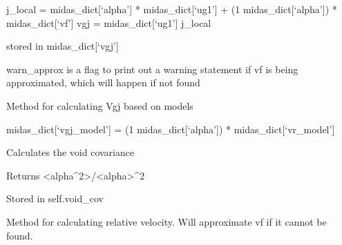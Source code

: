 \documentclass[letterpaper,10pt,english]{sphinxmanual}
\begin{document}
\begin{fulllineitems}
\begin{fulllineitems}
\sphinxAtStartPar
j\_local = midas\_dict{[}‘alpha’{]} * midas\_dict{[}‘ug1’{]} + (1 \sphinxhyphen{} midas\_dict{[}‘alpha’{]}) * midas\_dict{[}‘vf’{]}
vgj = midas\_dict{[}‘ug1’{]} \sphinxhyphen{} j\_local

\sphinxAtStartPar
stored in midas\_dict{[}‘vgj’{]}

\sphinxAtStartPar
warn\_approx is a flag to print out a warning statement if vf is being approximated, which will
happen if not found

\end{fulllineitems}


\begin{fulllineitems}
\label{\detokenize{api/MARIGOLD.Condition:MARIGOLD.Condition.calc_vgj_model}}
\pysigstartsignatures
{}
\pysigstopsignatures
\sphinxAtStartPar
Method for calculating Vgj based on models

\sphinxAtStartPar
midas\_dict{[}‘vgj\_model’{]} = (1 \sphinxhyphen{} midas\_dict{[}‘alpha’{]}) * midas\_dict{[}‘vr\_model’{]}

\end{fulllineitems}


\begin{fulllineitems}
\label{\detokenize{api/MARIGOLD.Condition:MARIGOLD.Condition.calc_void_cov}}
\pysigstartsignatures
{}
\pysigstopsignatures
\sphinxAtStartPar
Calculates the void covariance

\sphinxAtStartPar
Returns \textless{}alpha\textasciicircum{}2\textgreater{}/\textless{}alpha\textgreater{}\textasciicircum{}2

\sphinxAtStartPar
Stored in self.void\_cov

\end{fulllineitems}


\begin{fulllineitems}
\label{\detokenize{api/MARIGOLD.Condition:MARIGOLD.Condition.calc_vr}}
\pysigstartsignatures
{}
\pysigstopsignatures
\sphinxAtStartPar
Method for calculating relative velocity. Will approximate vf if it cannot be found.


\end{fulllineitems}
\end{fulllineitems}
\end{document}
